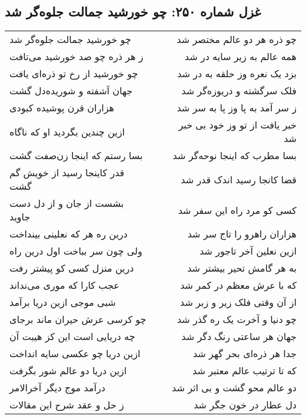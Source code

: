 \begin{center}
\section*{غزل شماره ۲۵۰: چو خورشید جمالت جلوه‌گر شد}
\label{sec:250}
\begin{longtable}{l p{0.5cm} r}
چو خورشید جمالت جلوه‌گر شد
&&
چو ذره هر دو عالم مختصر شد
\\
ز هر ذره چو صد خورشید می‌تافت
&&
همه عالم به زیر سایه در شد
\\
چو خورشید از رخ تو ذره‌ای یافت
&&
بزد یک نعره وز حلقه به در شد
\\
جهان آشفته و شوریده‌دل گشت
&&
فلک سرگشته و دریوزه‌گر شد
\\
هزاران قرن پوشیده کبودی
&&
ز سر آمد به پا وز پا به سر شد
\\
ازین چندین بگردید او که ناگاه
&&
خبر یافت از تو وز خود بی خبر شد
\\
بسا رستم که اینجا زن‌صفت گشت
&&
بسا مطرب که اینجا نوحه‌گر شد
\\
قدر کاینجا رسید از خویش گم گشت
&&
قضا کانجا رسید اندک قدر شد
\\
بشست از جان و از دل دست جاوید
&&
کسی کو مرد راه این سفر شد
\\
درین ره هر که نعلینی بینداخت
&&
هزاران راهرو را تاج سر شد
\\
ولی چون سر بباخت اول درین راه
&&
ازین نعلین آخر تاجور شد
\\
درین منزل کسی کو پیشتر رفت
&&
به هر گامش تحیر بیشتر شد
\\
عجب کارا که موری می‌نداند
&&
که با عرش معظم در کمر شد
\\
شبی موجی ازین دریا برآمد
&&
از آن وقتی فلک زیر و زبر شد
\\
چو کرسی عرش حیران ماند برجای
&&
چو دنیا و آخرت یک ره گذر شد
\\
چه دریایی است این کز هیبت آن
&&
جهان هر ساعتی رنگ دگر شد
\\
ازین دریا چو عکسی سایه انداخت
&&
جدا هر ذره‌ای بحر گهر شد
\\
ازین دریا دو عالم شور بگرفت
&&
که تا ترتیب عالم معتبر شد
\\
درآمد موج دیگر آخرالامر
&&
دو عالم محو گشت و بی اثر شد
\\
ز حل و عقد شرح این مقالات
&&
دل عطار در خون جگر شد
\\
\end{longtable}
\end{center}

